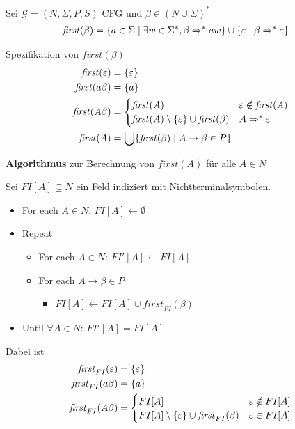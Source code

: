{\begin{Def}
  Sei $\mathcal{G} = (N, \Sigma, P, S)$ \ac{CFG} und $\beta \in
  (N\cup\Sigma)^*$
  \begin{align*}
    \mathit{first} (\beta) &= \{ a \in \Sigma \mid \exists w\in
    \Sigma^* , \beta \=>^* aw \} \cup \{\Eps \mid \beta \=>^* \Eps \}
  \end{align*}
\end{Def}

Spezifikation von $\mathit{first}(\beta)$
\begin{align*}
  \mathit{first} (\Eps) & = \{ \Eps \} \\
  \mathit{first} (a\beta) & = \{ a \} \\
  \mathit{first} (A\beta) & =
  \begin{cases}
    \mathit{first} (A) & \Eps \notin \mathit{first (A)} \\
    \mathit{first} (A) \setminus \{\Eps\} \cup \mathit{first} (\beta)
    & A\=>^* \Eps
  \end{cases} \\
  \mathit{first} (A) &= \bigcup  \{ \mathit{first} (\beta) \mid A \to
  \beta \in P \}
\end{align*}

\textbf{Algorithmus} zur Berechnung von $\mathit{first} (A)$ für alle $A\in N$

Sei $FI[A] \subseteq N$ ein Feld indiziert mit Nichtterminalsymbolen.

\begin{itemize}
\item[] For each $A \in N$: $FI[A] \gets \emptyset$
\item[] Repeat
  \begin{itemize}
  \item[] For each $A\in N$: $FI'[A] \gets FI[A]$
  \item[] For each $A \to \beta \in P$
    \begin{itemize}
    \item[] $FI[A] \gets FI[A] \cup \mathit{first}_{FI} (\beta)$
    \end{itemize}
  \end{itemize}
\item[] Until $\forall A\in N$: $FI'[A] = FI[A]$
\end{itemize}

Dabei ist
\begin{align*}
  \mathit{first}_{FI} (\varepsilon) & = \{ \varepsilon \} \\
  \mathit{first}_{FI} (a\beta) & = \{ a \} \\
  \mathit{first}_{FI} (A\beta) & =
  \begin{cases}
    FI[A] & \varepsilon \notin FI[A] \\
    FI[A] \setminus \{\varepsilon\} \cup \mathit{first}_{FI} (\beta)
    & \varepsilon\in FI[A]
  \end{cases} 
\end{align*}

}
